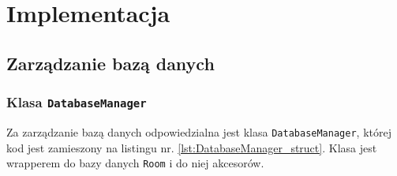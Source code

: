 	\newpage
\section{Implementacja}		%

\subsection{Zarządzanie bazą danych}

\subsubsection{Klasa \texttt{DatabaseManager}} \label{sec:DatabaseManager}

Za zarządzanie bazą danych odpowiedzialna jest klasa \texttt{DatabaseManager}, której kod jest zamieszony na listingu nr. \ref{lst:DatabaseManager_struct}. Klasa jest wrapperem do bazy danych \texttt{Room}\cite{doc_room} i do niej akcesorów.

